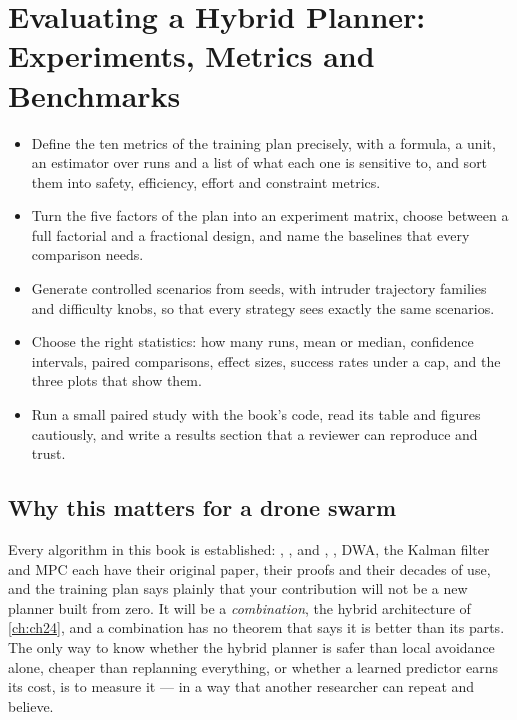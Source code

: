 \chapter[Evaluating a Hybrid Planner]{Evaluating a Hybrid Planner: Experiments, Metrics and Benchmarks}
\label{ch:ch25}

\begin{objectives}
\begin{itemize}
  \item Define the ten metrics of the training plan precisely, with a formula, a unit, an estimator over runs and a list of what each one is sensitive to, and sort them into safety, efficiency, effort and constraint metrics.
  \item Turn the five factors of the plan into an experiment matrix, choose between a full factorial and a fractional design, and name the baselines that every comparison needs.
  \item Generate controlled scenarios from seeds, with intruder trajectory families and difficulty knobs, so that every strategy sees exactly the same scenarios.
  \item Choose the right statistics: how many runs, mean or median, confidence intervals, paired comparisons, effect sizes, success rates under a cap, and the three plots that show them.
  \item Run a small paired study with the book's code, read its table and figures cautiously, and write a results section that a reviewer can reproduce and trust.
\end{itemize}
\end{objectives}

\section{Why this matters for a drone swarm}
\label{sec:ch25-motivation}

Every algorithm in this book is established: \astar, \dstarlite, \cbs and
\ecbs, \orca, DWA, the Kalman filter and MPC each have their original paper,
their proofs and their decades of use, and the training plan says plainly
that your contribution will not be a new planner built from zero. It will be
a \emph{combination}, the hybrid architecture of \cref{ch:ch24}, and a
combination has no theorem that says it is better than its parts. The only
way to know whether the hybrid planner is safer than local avoidance alone,
cheaper than replanning everything, or whether a learned predictor earns
its cost, is to measure it --- in a way that another researcher can repeat
and believe.

